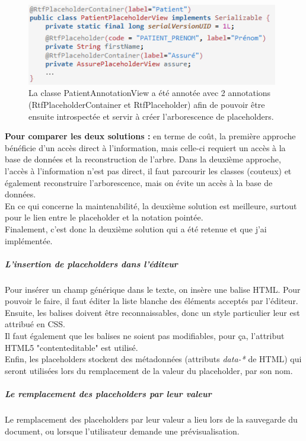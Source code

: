 \begin{figure}[H]
  \centering
  \includegraphics[width=11cm]{./img/annotations1}
  \caption{\label{fig:annotations} La classe PatientAnnotationView a été annotée avec 2 annotations (RtfPlaceholderContainer et RtfPlaceholder) afin de pouvoir être ensuite introspectée et servir à créer l'arborescence de placeholders.}
\end{figure}

\textbf{Pour comparer les deux solutions :} en terme de co\^ut, la première approche bénéficie d'un accès direct à l'information, mais celle-ci requiert un accès à la base de données et la reconstruction de l'arbre. Dans la deuxième approche, l'accès à l'information n'est pas direct, il faut parcourir les classes (couteux) et également reconstruire l'arborescence, mais on évite un accès à la base de données.\\
En ce qui concerne la maintenabilité, la deuxième solution est meilleure, surtout pour le lien entre le placeholder et la notation pointée.\\
Finalement, c'est donc la deuxième solution qui a été retenue et que j'ai implémentée.

\subparagraph*{L'insertion de placeholders dans l'éditeur}
Pour insérer un champ générique dans le texte, on insère une balise HTML. Pour pouvoir le faire, il faut éditer la liste blanche des éléments acceptés par l'éditeur. Ensuite, les balises doivent être reconnaissables, donc un style particulier leur est attribué en CSS.\\
Il faut également que les balises ne soient pas modifiables, pour ça, l'attribut HTML5 "contenteditable" est utilisé.\\
Enfin, les placeholders stockent des métadonnées  (attributs \textit{data-*} de HTML) qui seront utilisées lors du remplacement de la valeur du placeholder, par son nom.

\subparagraph*{Le remplacement des placeholders par leur valeur}
Le remplacement des placeholders par leur valeur a lieu lors de la sauvegarde du document, ou lorsque l'utilisateur demande une prévisualisation.\\


